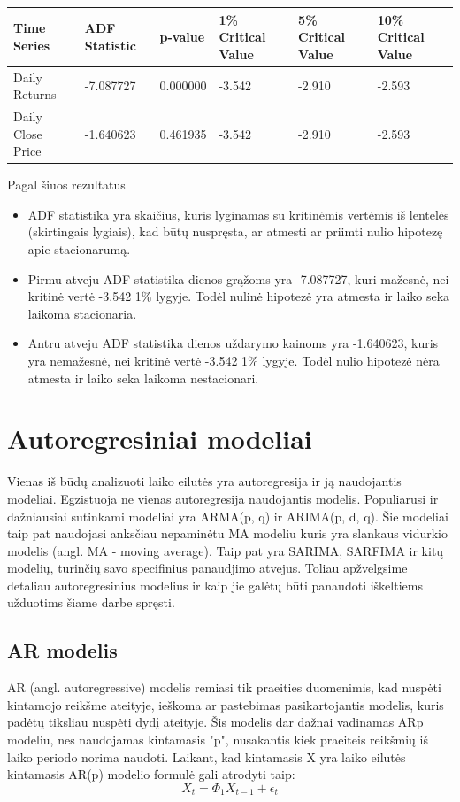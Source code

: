 \documentclass{VUMIFInfKursinis}
\begin{document}
\begin{tabularx}{\linewidth}{|X|X|X|X|X|X|}
  \hline
  \textbf{Time Series} & \textbf{ADF Statistic} & \textbf{p-value} & \textbf{1\% Critical Value} & \textbf{5\% Critical Value} & \textbf{10\% Critical Value} \\ \hline
  Daily Returns        & -7.087727              & 0.000000         & -3.542                      & -2.910                      & -2.593                       \\ \hline
  Daily Close Price    & -1.640623              & 0.461935         & -3.542                      & -2.910                      & -2.593                       \\ \hline
\end{tabularx}

\vspace{10pt}
Pagal šiuos rezultatus
\begin{itemize}
  \item ADF statistika yra skaičius, kuris lyginamas su kritinėmis vertėmis iš lentelės (skirtingais lygiais), kad būtų nuspręsta, ar atmesti ar priimti nulio hipotezę apie stacionarumą.
  \item Pirmu atveju ADF statistika dienos grąžoms yra -7.087727, kuri mažesnė, nei kritinė vertė -3.542 1\% lygyje. Todėl nulinė hipotezė yra atmesta ir laiko seka laikoma stacionaria.
  \item Antru atveju ADF statistika dienos uždarymo kainoms yra -1.640623, kuris yra nemažesnė, nei kritinė vertė -3.542 1\% lygyje. Todėl nulio hipotezė nėra atmesta ir laiko seka laikoma nestacionari.
\end{itemize}

\section{Autoregresiniai modeliai}
Vienas iš būdų analizuoti laiko eilutės yra autoregresija ir ją naudojantis modeliai. Egzistuoja ne vienas autoregresija naudojantis modelis. 
Populiarusi ir dažniausiai sutinkami modeliai yra ARMA(p, q) ir ARIMA(p, d, q).
Šie modeliai taip pat naudojasi anksčiau nepaminėtu MA modeliu kuris yra slankaus vidurkio modelis (angl. MA - moving average).
Taip pat yra SARIMA, SARFIMA ir kitų modelių, turinčių savo specifinius panaudjimo atvejus. 
Toliau apžvelgsime detaliau autoregresinius modelius ir kaip jie galėtų būti panaudoti iškeltiems užduotims šiame darbe spręsti.

\subsection{AR modelis}
AR (angl. autoregressive) modelis remiasi tik praeities duomenimis, kad nuspėti kintamojo reikšme ateityje, ieškoma ar pastebimas pasikartojantis
modelis, kuris padėtų tiksliau nuspėti dydį ateityje\cite{chi2018stock}. Šis modelis dar dažnai vadinamas ARp modeliu, nes naudojamas kintamasis "p", nusakantis kiek praeiteis reikšmių 
iš laiko periodo norima naudoti. Laikant, kad kintamasis X yra laiko eilutės kintamasis AR(p) modelio formulė gali atrodyti taip: 
\[X_{t} = \Phi _{1}X_{t-1}+\epsilon_{t} \]
\end{document}
